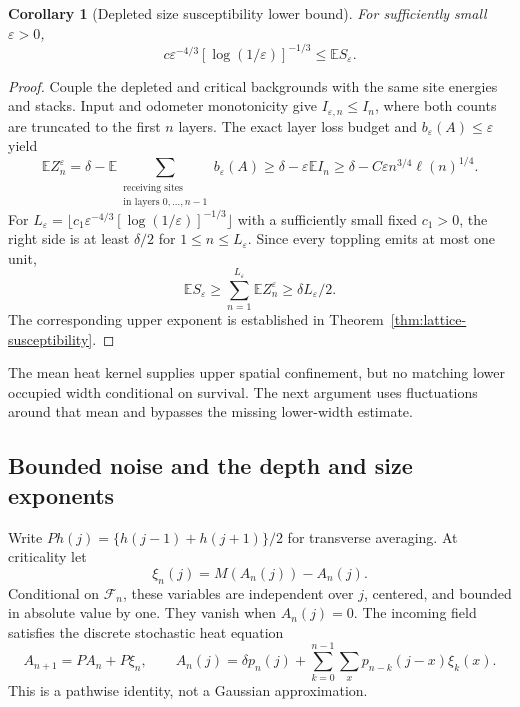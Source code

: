 \documentclass[11pt]{article}
\numberwithin{equation}{section}
\newtheorem{corollary}[theorem]{Corollary}
\theoremstyle{definition}
\newcommand{\E}{\mathbb E}
\begin{document}
\begin{corollary}[Depleted size susceptibility lower bound]\label{cor:depleted-size-lower}
For sufficiently small $\varepsilon>0$,
\begin{equation}\label{eq:improved-depleted-size}
 c\varepsilon^{-4/3}[\log(1/\varepsilon)]^{-1/3}
 \le\E S_\varepsilon.
\end{equation}
\end{corollary}
\begin{proof}
Couple the depleted and critical backgrounds with the same site energies and stacks. Input and odometer monotonicity give $I_{\varepsilon,n}\le I_n$, where both counts are truncated to the first $n$ layers. The exact layer loss budget and $b_\varepsilon(A)\le\varepsilon$ yield
\[
 \E Z_n^\varepsilon
 =\delta-\E\sum_{\substack{\text{receiving sites}\\\text{in layers }0,\ldots,n-1}}
 b_\varepsilon(A)
 \ge\delta-\varepsilon\E I_n
 \ge\delta-C\varepsilon n^{3/4}\ell(n)^{1/4}.
\]
For $L_\varepsilon=\lfloor c_1\varepsilon^{-4/3}[\log(1/\varepsilon)]^{-1/3}\rfloor$ with a sufficiently small fixed $c_1>0$, the right side is at least $\delta/2$ for $1\le n\le L_\varepsilon$. Since every toppling emits at most one unit,
\[
 \E S_\varepsilon\ge\sum_{n=1}^{L_\varepsilon}\E Z_n^\varepsilon
 \ge\delta L_\varepsilon/2.
\]
The corresponding upper exponent is established in Theorem~\ref{thm:lattice-susceptibility}.
\end{proof}
The mean heat kernel supplies upper spatial confinement, but no matching lower occupied width conditional on survival. The next argument uses fluctuations around that mean and bypasses the missing lower-width estimate.

\subsection{Bounded noise and the depth and size exponents}\label{sec:heat-noise}
Write $P h(j)=\{h(j-1)+h(j+1)\}/2$ for transverse averaging. At criticality let
\[
 \xi_n(j)=M(A_n(j))-A_n(j).
\]
Conditional on $\mathcal F_n$, these variables are independent over $j$, centered, and bounded in absolute value by one. They vanish when $A_n(j)=0$. The incoming field satisfies the discrete stochastic heat equation
\begin{equation}\label{eq:stochastic-heat}
 A_{n+1}=P A_n+P\xi_n,\qquad
 A_n(j)=\delta p_n(j)+\sum_{k=0}^{n-1}\sum_x p_{n-k}(j-x)\xi_k(x).
\end{equation}
This is a pathwise identity, not a Gaussian approximation.
\end{document}
